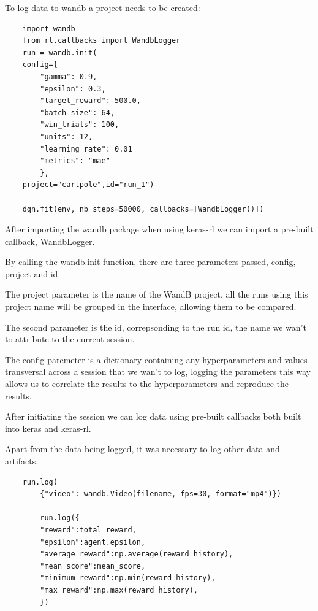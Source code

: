 To log data to wandb a project needs to be created:

\lstset{language=Python}
\lstset{frame=lines}
\lstset{basicstyle=\footnotesize}
\begin{lstlisting}
    import wandb
    from rl.callbacks import WandbLogger
    run = wandb.init(
    config={
        "gamma": 0.9, 
        "epsilon": 0.3,
        "target_reward": 500.0,
        "batch_size": 64,
        "win_trials": 100,
        "units": 12,
        "learning_rate": 0.01
        "metrics": "mae"
        },
    project="cartpole",id="run_1")
    
    dqn.fit(env, nb_steps=50000, callbacks=[WandbLogger()])
\end{lstlisting}

After importing the wandb package when using keras-rl we can import a pre-built callback, WandbLogger.

By calling the wandb.init function, there are three parameters passed, config, project and id.

The project parameter is the name of the WandB project, all the runs using this project name will be grouped in the interface, allowing them to be compared. 

The second parameter is the id, correpsonding to the run id, the name we wan't to attribute to the current session. 

The config paremeter is a dictionary containing any hyperparameters and values transversal across a session that we wan't to log, logging the parameters this way allows us to correlate the results to the hyperparameters and reproduce the results.

After initiating the session we can log data using pre-built callbacks both built into keras and keras-rl.

Apart from the data being logged, it was necessary to log other data and artifacts.

\lstset{language=Python}
\lstset{frame=lines}
\lstset{basicstyle=\footnotesize}
\begin{lstlisting}
    run.log(
        {"video": wandb.Video(filename, fps=30, format="mp4")})
    
        run.log({
        "reward":total_reward,
        "epsilon":agent.epsilon,
        "average reward":np.average(reward_history),
        "mean score":mean_score,
        "minimum reward":np.min(reward_history),
        "max reward":np.max(reward_history),
        })
\end{lstlisting}

